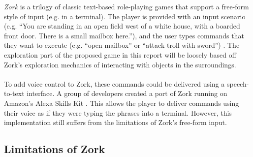 \documentclass[11pt]{article}
\begin{document}
\textit{Zork} is a trilogy of classic text-based role-playing games that support a free-form style of input (e.g. in a terminal). The player is provided with an input scenario (e.g. ``You are standing in an open field west of a white house, with a boarded front door. There is a small mailbox here.''), and the user types commands that they want to execute (e.g. ``open mailbox'' or ``attack troll with sword'') \cite{RefWorks:35}. The exploration part of the proposed game in this report will be loosely based off Zork's exploration mechanics of interacting with objects in the surroundings.
\\
\\
To add voice control to Zork, these commands could be delivered using a speech-to-text interface. A group of developers created a port of Zork running on Amazon's Alexa Skills Kit \cite{RefWorks:37}. This allows the player to deliver commands using their voice as if they were typing the phrases into a terminal. However, this implementation still suffers from the limitations of Zork's free-form input.

\subsection{Limitations of Zork}
\end{document}
